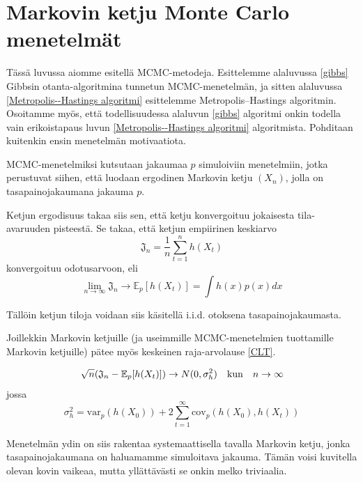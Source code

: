 \chapter{Markovin ketju Monte Carlo menetelmät}

Tässä luvussa aiomme esitellä MCMC-metodeja. Esittelemme alaluvussa \ref{gibbs} Gibbsin otanta-algoritmina tunnetun MCMC-menetelmän, ja sitten alaluvussa \ref{Metropolis--Hastings algoritmi} esittelemme Metropolis--Hastings algoritmin. Osoitamme myös, että todellisuudessa alaluvun \ref{gibbs} algoritmi onkin todella vain erikoistapaus luvun \ref{Metropolis--Hastings algoritmi} algoritmista. Pohditaan kuitenkin ensin menetelmän motivaatiota.
 
\begin{maar}
	MCMC-menetelmiksi kutsutaan jakaumaa $p$ simuloiviin menetelmiin, jotka perustuvat siihen, että luodaan ergodinen Markovin ketju $(X_n)$, jolla on tasapainojakaumana jakauma $p$.
\end{maar}

Ketjun ergodisuus takaa siis sen, että ketju konvergoituu jokaisesta tila-avaruuden pisteestä. Se takaa, että ketjun empiirinen keskiarvo
\begin{equation}
	\mathfrak{J}_n = \frac{1}{n} \sum_{t=1}^{n} h(X_t)
\end{equation}
konvergoituu odotusarvoon, eli
\begin{equation}
	\lim_{n\to\infty} \mathfrak J_n \to \mathbb{E}_p[h(X_t)] = \int h(x)p(x)dx
\end{equation}

Tällöin ketjun tiloja voidaan siis käsitellä i.i.d. otoksena tasapainojakaumasta.

Joillekkin Markovin ketjuille (ja useimmille MCMC-menetelmien tuottamille Markovin ketjuille) pätee myös keskeinen raja-arvolause \ref{CLT}.

\begin{equation}\label{CLT}
	\sqrt{n}\qty(\mathfrak{J}_n-\mathbb{E}_p[h(X_t)]) \to N(0, \sigma^2_h) \qq{kun} n\to\infty
\end{equation}
jossa 
\begin{equation}
	\sigma^2_h = \text{var}_p(h(X_0))+2\sum_{t=1}^{\infty}\text{cov}_p(h(X_0),h(X_t))
\end{equation}

Menetelmän ydin on siis rakentaa systemaattisella tavalla Markovin ketju, jonka tasapainojakaumana on haluamamme simuloitava jakauma. Tämän voisi kuvitella olevan kovin vaikeaa, mutta yllättävästi se onkin melko triviaalia.

